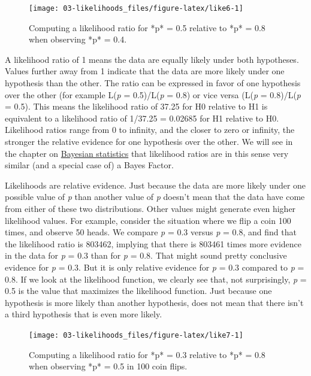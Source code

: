 \documentclass[
]{krantz}
\begin{document}
\begin{figure}

{\centering \texttt{[image: 03-likelihoods\_files/figure-latex/like6-1]} 

}

\caption{Computing a likelihood ratio for *p* = 0.5 relative to *p* = 0.8 when observing *p* = 0.4.}\label{fig:like6}
\end{figure}

A likelihood ratio of 1 means the data are equally likely under both hypotheses. Values further away from 1 indicate that the data are more likely under one hypothesis than the other. The ratio can be expressed in favor of one hypothesis over the other (for example L(\emph{p} = 0.5)/L(\emph{p} = 0.8) or vice versa (L(\emph{p} = 0.8)/L(\emph{p} = 0.5). This means the likelihood ratio of 37.25 for H0 relative to H1 is equivalent to a likelihood ratio of 1/37.25 = 0.02685 for H1 relative to H0. Likelihood ratios range from 0 to infinity, and the closer to zero or infinity, the stronger the relative evidence for one hypothesis over the other. We will see in the chapter on \protect\hyperlink{bayes}{Bayesian statistics} that likelihood ratios are in this sense very similar (and a special case of) a Bayes Factor.

Likelihoods are relative evidence. Just because the data are more likely under one possible value of \emph{p} than another value of \emph{p} doesn't mean that the data have come from either of these two distributions. Other values might generate even higher likelihood values. For example, consider the situation where we flip a coin 100 times, and observe 50 heads. We compare \emph{p} = 0.3 versus \emph{p} = 0.8, and find that the likelihood ratio is 803462, implying that there is 803461 times more evidence in the data for \emph{p} = 0.3 than for \emph{p} = 0.8. That might sound pretty conclusive evidence for \emph{p} = 0.3. But it is only relative evidence for \emph{p} = 0.3 compared to \emph{p} = 0.8. If we look at the likelihood function, we clearly see that, not surprisingly, \emph{p} = 0.5 is the value that maximizes the likelihood function. Just because one hypothesis is more likely than another hypothesis, does not mean that there isn't a third hypothesis that is even more likely.

\begin{figure}

{\centering \texttt{[image: 03-likelihoods\_files/figure-latex/like7-1]} 

}

\caption{Computing a likelihood ratio for *p* = 0.3 relative to *p* = 0.8 when observing *p* = 0.5 in 100 coin flips.}\label{fig:like7}
\end{figure}
\end{document}
